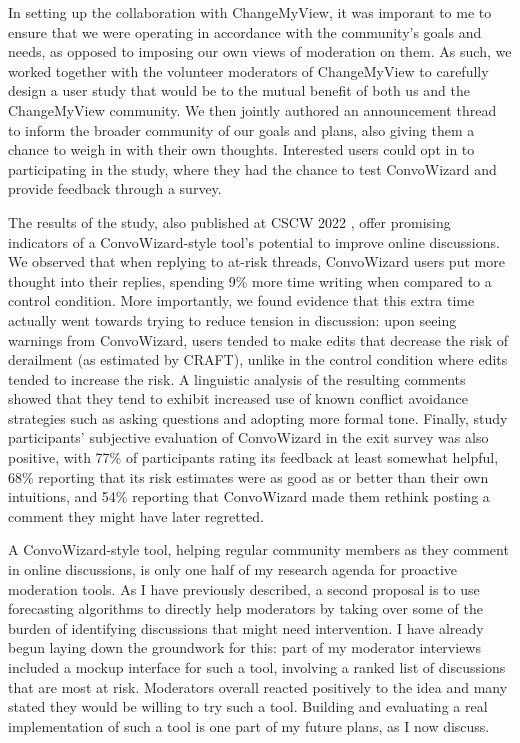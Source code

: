 \documentclass[11pt,letterpaper]{article}
\begin{document}
In setting up the collaboration with ChangeMyView, it was imporant to me to ensure that we were operating in accordance with the community's goals and needs, as opposed to imposing our own views of moderation on them.
As such, we worked together with the volunteer moderators of ChangeMyView to carefully design a user study that would be to the mutual benefit of both us and the ChangeMyView community.
We then jointly authored an announcement thread to inform the broader community of our goals and plans, also giving them a chance to weigh in with their own thoughts.
Interested users could opt in to participating in the study, where they had the chance to test ConvoWizard and provide feedback through a survey.

The results of the study, also published at CSCW 2022 \cite{chang_thread_2022}, offer promising indicators of a ConvoWizard-style tool's potential to improve online discussions.
We observed that when replying to at-risk threads, ConvoWizard users put more thought into their replies, spending 9\% more time writing when compared to a control condition.
More importantly, we found evidence that this extra time actually went towards trying to reduce tension in discussion: upon seeing warnings from ConvoWizard, users tended to make edits that decrease the risk of derailment (as estimated by CRAFT), unlike in the control condition where edits tended to increase the risk.
A linguistic analysis of the resulting comments showed that they tend to exhibit increased use of known conflict avoidance strategies such as asking questions and adopting more formal tone.
Finally, study participants' subjective evaluation of ConvoWizard in the exit survey was also positive, with 77\% of participants rating its feedback at least somewhat helpful, 68\% reporting that its risk estimates were as good as or better than their own intuitions, and 54\% reporting that ConvoWizard made them rethink posting a comment they might have later regretted.

A ConvoWizard-style tool, helping regular community members as they comment in online discussions, is only one half of my research agenda for proactive moderation tools.
As I have previously described, a second proposal is to use forecasting algorithms to directly help moderators by taking over some of the burden of identifying discussions that might need intervention.
I have already begun laying down the groundwork for this: part of my moderator interviews included a mockup interface for such a tool, involving a ranked list of discussions that are most at risk.
Moderators overall reacted positively to the idea and many stated they would be willing to try such a tool.
Building and evaluating a real implementation of such a tool is one part of my future plans, as I now discuss.
\end{document}
